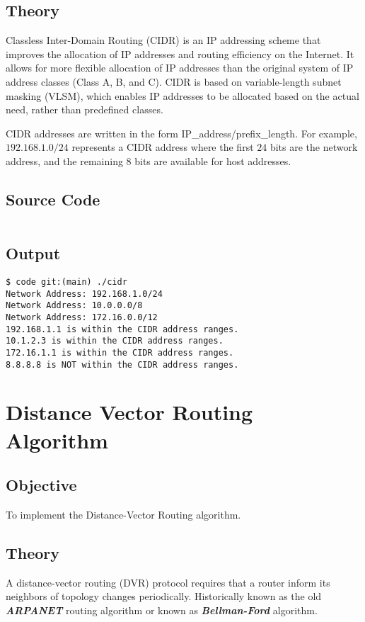 \documentclass{korigamik}
\begin{document}
\subsection{Theory}
Classless Inter-Domain Routing (CIDR) is an IP addressing scheme that improves
the allocation of IP addresses and routing efficiency on the Internet. It
allows for more flexible allocation of IP addresses than the original system of
IP address classes (Class A, B, and C). CIDR is based on variable-length subnet
masking (VLSM), which enables IP addresses to be allocated based on the actual
need, rather than predefined classes.

CIDR addresses are written in the form IP\_address/prefix\_length. For example,
$192.168.1.0/24$ represents a CIDR address where the first $24$ bits are the
network address, and the remaining 8 bits are available for host addresses.

\subsection{Source Code}

\inputminted[firstline=9, fontsize=\footnotesize]{cpp}{code/cidr.cpp}

\subsection{Output}

\begin{lstlisting}[style=output]
$ code git:(main) ./cidr
Network Address: 192.168.1.0/24
Network Address: 10.0.0.0/8
Network Address: 172.16.0.0/12
192.168.1.1 is within the CIDR address ranges.
10.1.2.3 is within the CIDR address ranges.
172.16.1.1 is within the CIDR address ranges.
8.8.8.8 is NOT within the CIDR address ranges.
\end{lstlisting}

\iffalse
\pagebreak

\section{Distance Vector Routing Algorithm}
\label{sec:Distance Vector Routing Algorithm}

\subsection{Objective}
To implement the Distance-Vector Routing algorithm.

\subsection{Theory}
A distance-vector routing (DVR) protocol requires that a router inform its
neighbors of topology changes periodically. Historically known as the old
\textbf{\textit{ARPANET}} routing algorithm or known as \textbf{\textit{Bellman-Ford}} algorithm.
\end{document}
